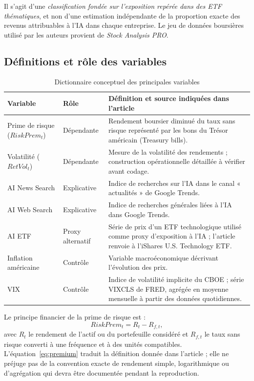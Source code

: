 \documentclass[11pt,a4paper]{article}
\begin{document}
Il s'agit d'une \emph{classification fondée sur l'exposition repérée dans des ETF thématiques}, et non d'une estimation indépendante de la proportion exacte des revenus attribuables à l'IA dans chaque entreprise. Le jeu de données boursières utilisé par les auteurs provient de \emph{Stock Analysis PRO}.

\subsection{Définitions et rôle des variables}
\begin{table}[H]
\centering\footnotesize
\caption{Dictionnaire conceptuel des principales variables}
\begin{tabularx}{\textwidth}{@{}p{2.65cm}p{2.25cm}X@{}}
\toprule
\textbf{Variable} & \textbf{Rôle} & \textbf{Définition et source indiquées dans l'article}\\
\midrule
Prime de risque ($RiskPrem_t$) & Dépendante & Rendement boursier diminué du taux sans risque représenté par les bons du Trésor américain (Treasury bills).\\
Volatilité ($RetVol_t$) & Dépendante & Mesure de la volatilité des rendements ; construction opérationnelle détaillée à vérifier avant codage.\\
AI News Search & Explicative & Indice de recherches sur l'IA dans le canal « actualités » de Google Trends.\\
AI Web Search & Explicative & Indice de recherches générales liées à l'IA dans Google Trends.\\
AI ETF & Proxy alternatif & Série de prix d'un ETF technologique utilisé comme proxy d'exposition à l'IA ; l'article renvoie à l'iShares U.S. Technology ETF.\\
Inflation américaine & Contrôle & Variable macroéconomique décrivant l'évolution des prix.\\
VIX & Contrôle & Indice de volatilité implicite du CBOE ; série VIXCLS de FRED, agrégée en moyenne mensuelle à partir des données quotidiennes.\\
\bottomrule
\end{tabularx}
\end{table}

Le principe financier de la prime de risque est :
\begin{equation}
RiskPrem_t = R_t-R_{f,t},
\label{eq:premium}
\end{equation}
avec $R_t$ le rendement de l'actif ou du portefeuille considéré et $R_{f,t}$ le taux sans risque converti à une fréquence et à des unités compatibles. L'équation~\eqref{eq:premium} traduit la définition donnée dans l'article ; elle ne préjuge pas de la convention exacte de rendement simple, logarithmique ou d'agrégation qui devra être documentée pendant la reproduction.
\end{document}
